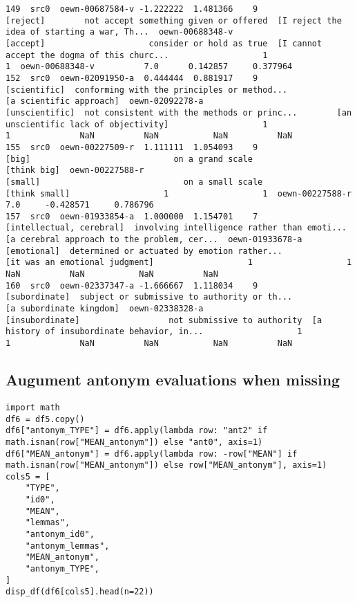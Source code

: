 \documentclass[a4paper,10pt,onecolumn,oneside,openright]{article}
\begin{document}
\begin{verbatim}
149  src0  oewn-00687584-v -1.222222  1.481366    9                                     [reject]        not accept something given or offered  [I reject the idea of starting a war, Th...  oewn-00688348-v                                     [accept]                     consider or hold as true  [I cannot accept the dogma of this churc...                   1                   1  oewn-00688348-v          7.0      0.142857     0.377964
152  src0  oewn-02091950-a  0.444444  0.881917    9                                 [scientific]  conforming with the principles or method...                      [a scientific approach]  oewn-02092278-a                               [unscientific]  not consistent with the methods or princ...        [an unscientific lack of objectivity]                   1                   1              NaN          NaN           NaN          NaN
155  src0  oewn-00227509-r  1.111111  1.054093    9                                        [big]                             on a grand scale                                  [think big]  oewn-00227588-r                                      [small]                             on a small scale                                [think small]                   1                   1  oewn-00227588-r          7.0     -0.428571     0.786796
157  src0  oewn-01933854-a  1.000000  1.154701    7                     [intellectual, cerebral]  involving intelligence rather than emoti...  [a cerebral approach to the problem, cer...  oewn-01933678-a                                  [emotional]  determined or actuated by emotion rather...               [it was an emotional judgment]                   1                   1              NaN          NaN           NaN          NaN
160  src0  oewn-02337347-a -1.666667  1.118034    9                                [subordinate]  subject or submissive to authority or th...                      [a subordinate kingdom]  oewn-02338328-a                              [insubordinate]                  not submissive to authority  [a history of insubordinate behavior, in...                   1                   1              NaN          NaN           NaN          NaN
\end{verbatim}

\subsection{Augument antonym evaluations when missing}
\label{sec:orge42e505}
\begin{verbatim}
import math
df6 = df5.copy()
df6["antonym_TYPE"] = df6.apply(lambda row: "ant2" if math.isnan(row["MEAN_antonym"]) else "ant0", axis=1)
df6["MEAN_antonym"] = df6.apply(lambda row: -row["MEAN"] if math.isnan(row["MEAN_antonym"]) else row["MEAN_antonym"], axis=1)
cols5 = [
    "TYPE",
    "id0",
    "MEAN",
    "lemmas",
    "antonym_id0",
    "antonym_lemmas",
    "MEAN_antonym",
    "antonym_TYPE",
]
disp_df(df6[cols5].head(n=22))
\end{verbatim}
\end{document}
